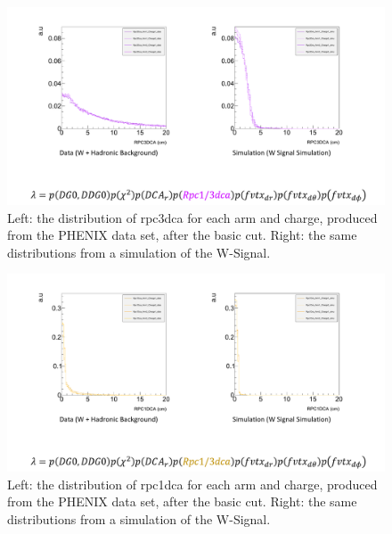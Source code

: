 \begin{figure}
  \centering
  \includegraphics[width=\linewidth,trim=4 4 4 4,clip]{./figures/pdf_rpc3dca.png}
  \caption{
    Left: the distribution of rpc3dca for each arm and charge, produced from the
    PHENIX data set, after the basic cut. Right: the same distributions from a
    simulation of the W-Signal.
  }
  \label{fig:pdf_rpc3dca}
\end{figure}

\begin{figure}
  \centering
  \includegraphics[width=\linewidth,trim=4 4 4 4,clip]{./figures/pdf_rpc1dca.png}
  \caption{
    Left: the distribution of rpc1dca for each arm and charge, produced from the
    PHENIX data set, after the basic cut. Right: the same distributions from a
    simulation of the W-Signal.
  }
  \label{fig:pdf_rpc1dca}
\end{figure}

